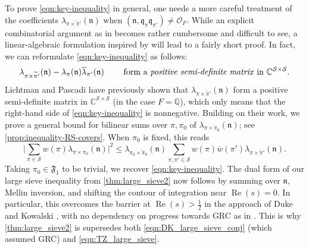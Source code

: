\documentclass[11pt]{amsart}
\theoremstyle{remark}
\numberwithin{equation}{section}
\newcommand{\n}{\mathfrak{n}}
\newcommand{\kn}{\mathfrak{n}}
\newcommand{\kq}{\mathfrak{q}}
\newcommand{\Q}{\mathbb{Q}}
\newcommand{\mS}{\mathcal{S}}
\renewcommand{\Re}{\textnormal{Re}}
\renewcommand{\bar}{\overline}
\renewcommand{\tilde}{\widetilde}
\renewcommand{\Re}{\mathop{\mathrm{Re}}}
\begin{document}
To prove \eqref{eqn:key-inequality} in general, one needs a more careful treatment of the coefficients $\lambda_{\pi\times\tilde\pi'}(\kn)$ when $(\kn,\kq_{\pi}\kq_{\pi'})\neq\mathcal{O}_F$. While an explicit combinatorial argument as in \cite{TZ_GLn} becomes rather cumbersome and difficult to see, a linear-algebraic formulation inspired by \cite{lichtman2024density} will lead to a fairly short proof. In fact, we can reformulate \eqref{eqn:key-inequality} as follows:
\begin{equation} \label{eqn:posdef-claim}
    \lambda_{\pi \times \tilde\pi'}(\kn) - \lambda_\pi(\kn) \bar \lambda_{\pi'}(\kn)
    \qquad \text{ form a \emph{positive semi-definite matrix} in } \mathbb{C}^{\mS \times \mS}.
\end{equation}
Lichtman and Pascadi  \cite[Proposition 4]{lichtman2024density} have previously shown that $\lambda_{\pi \times \tilde\pi'}(\n)$ form a positive semi-definite matrix in $\mathbb{C}^{\mS \times \mS}$ (in the case $F = \Q$), which only means that the right-hand side of \cref{eqn:key-inequality} is nonnegative. Building on their work, we prove a general bound for bilinear sums over $\pi, \pi_0$ of $\lambda_{\pi \times \pi_0}(\kn)$; see \cref{prop:inequality-RS-covers}. When $\pi_0$ is fixed, this reads
\begin{equation} \label{eqn:inequality-RS}
    \Bigg| \sum_{\pi \in \mS} w(\pi) \lambda_{\pi \times \pi_0}(\n) \Bigg|^2
    \le 
    \lambda_{\pi_0 \times \tilde\pi_0}(\n) \sum_{\pi, \pi' \in \mS} w(\pi) \bar w(\pi') \lambda_{\pi \times \tilde\pi'}(\n).
\end{equation}
Taking $\pi_0\in\mathfrak{F}_1$ to be trivial, we recover \cref{eqn:key-inequality}. The dual form of our large sieve inequality from \cref{thm:large_sieve2} now follows by summing over $\kn$, Mellin inversion, and shifting the contour of integration near $\Re(s) = 0$. In particular, this overcomes the barrier at $\Re(s) > \tfrac{1}{2}$ in the approach of Duke and Kowalski \cite{DK}, with no dependency on progress towards GRC as in \cite{TZ_GLn, humphries2024zeros}. This is why \cref{thm:large_sieve2} is supersedes both \cref{eqn:DK_large_sieve_conj} (which assumed GRC) and \cref{eqn:TZ_large_sieve}.
\end{document}
